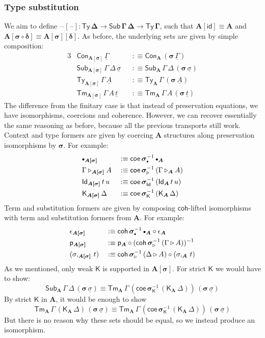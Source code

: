\documentclass[12pt,a4paper,twoside,openany]{book}
\theoremstyle{remark}
\theoremstyle{definition}
\theoremstyle{theorem}
\newcommand{\bs}[1]{\boldsymbol{#1}}
\newcommand{\id}{\mathsf{id}}
\newcommand{\Con}{\mathsf{Con}}
\newcommand{\Sub}{\mathsf{Sub}}
\newcommand{\Tm}{\mathsf{Tm}}
\newcommand{\Ty}{\mathsf{Ty}}
\newcommand{\Id}{\mathsf{Id}}
\newcommand{\blank}{\mathord{\hspace{1pt}\text{--}\hspace{1pt}}}
\newcommand{\ra}{\rightarrow}
\newcommand{\ext}{\triangleright}
\newcommand{\emptycon}{\scaleobj{.75}\bullet}
\newcommand{\p}{\mathsf{p}}
\newcommand{\K}{\mathsf{K}}
\newcommand{\bsigma}{\bs{\sigma}}
\newcommand{\bA}{\bs{A}}
\newcommand{\ul}[1]{\underline{#1}}
\newcommand{\ulGamma}{\ul{\Gamma}}
\newcommand{\ulsigma}{\ul{\sigma}}
\newcommand{\ult}{\ul{t}}
\newcommand{\ulA}{\ul{A}}
\newcommand{\coe}{\mathsf{coe}}
\newcommand{\coh}{\mathsf{coh}}
\newcommand{\defn}{:\equiv}
\begin{document}
\subsubsection{Type substitution}
We aim to define $\bs{\blank[\blank] : \Ty\,\Delta \ra \Sub\,\Gamma\,\Delta \ra
  \Ty\,\Gamma}$, such that $\bs{A[\id]} \equiv \bA$ and $\bs{A[\sigma\circ\delta]} \equiv
\bs{A[\sigma][\delta]}$. As before, the underlying sets are given by simple
composition:
\begin{alignat*}{3}
  & \Con_{\bs{A[\sigma]}}\,\ulGamma && \defn \Con_{\bA}\,(\bsigma\,\ulGamma)\\
  & \Sub_{\bs{A[\sigma]}}\,\Gamma\,\Delta\,\ulsigma && \defn
    \Sub_{\bA}\,\Gamma\,\Delta\,(\bsigma\,\ulsigma)\\
  & \Ty_{\bs{A[\sigma]}}\,\Gamma\,\ulA && \defn
      \Ty_{\bA}\,\Gamma\,(\bsigma\,\ulA)\\
  & \Tm_{\bs{A[\sigma]}}\,\Gamma\,A\,\ult && \defn
      \Tm_{\bA}\,\Gamma\,A\,(\bsigma\,\ult)
\end{alignat*}
The difference from the finitary case is that instead of preservation equations,
we have isomorphisms, coercions and coherence. However, we can recover
essentially the same reasoning as before, because all the previous transports
still work. Context and type formers are given by coercing $\bA$ structures
along preservation isomorphisms by $\bsigma$. For example:
\begin{alignat*}{3}
  &\emptycon_{\bs{A[\sigma]}} && \defn
    \coe\,\bsigma_{\emptycon}^{-1}\,\emptycon_{\bA}\\
  &\Gamma\ext_{\bs{A[\sigma]}}A && \defn
    \coe\,\bsigma_{\ext}^{-1}\,(\Gamma\ext_{\bA} A)\\
  &\Id_{\bs{A[\sigma]}}\,t\,u && \defn
    \coe\,\bsigma_{\Id}^{-1}\,(\Id_{\bA}\,t\,u)\\
  &\K_{\bs{A[\sigma]}}\,\Delta && \defn
    \coe\,\bsigma_{\K}^{-1}\,(\K_{\bA}\,\Delta)
\end{alignat*}
Term and substitution formers are given by composing $\coh$-lifted
isomorphisms with term and substitution formers from $\bA$. For example:
\begin{alignat*}{3}
  & \epsilon_{\bs{A[\sigma]}} && \defn
    \coh\,\bsigma_{\emptycon}^{-1}\,\emptycon_{\bA} \circ \epsilon_{\bA}\\
  & \p_{\bs{A[\sigma]}} && \defn
    \p_{\bA} \circ (\coh\,\bsigma_{\ext}^{-1}\,(\Gamma\ext A))^{-1}\\
  & (\sigma,_{\bs{A[\sigma]}}\,t) && \defn \coh\,\bsigma_{\ext}^{-1}\,(\Delta\ext A) \circ (\sigma,_{\bA}\,t)
\end{alignat*}
As we mentioned, only weak $\K$ is supported in $\bs{A[\sigma]}$. For strict $\K$
we would have to show:
\[
\Sub_{\bA}\,\Gamma\,\Delta\,(\bsigma\,\ulsigma)
\equiv \Tm_{\bA}\,\Gamma\,(\coe\,\bsigma_{\K}^{-1}\,(\K_{\bA}\,\Delta))\,(\bsigma\,\ulsigma)
\]
By strict $\K$ in $\bA$, it would be enough to show
\[
\Tm_{\bA}\,\Gamma\,(\K_{\bA}\,\Delta)\,(\bsigma\,\ulsigma)
\equiv \Tm_{\bA}\,\Gamma\,(\coe\,\bsigma_{\K}^{-1}\,(\K_{\bA}\,\Delta))\,(\bsigma\,\ulsigma)
\]
But there is no reason why these sets should be equal, so we instead produce an isomorphism.
\end{document}

